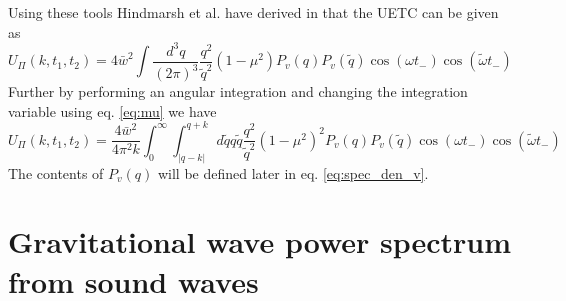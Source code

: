 \iffalse
The Fourier transformation of the velocity field can be denoted as
\cite[eq. 3.13]{hindmarsh_gw_pt_2019}
\begin{equation}
\tilde{v}_\mathbb{q}^i(t) = \int d^3 xv^i (\mathbb{x},t) e^{-i \mathbb{q} \cdot \mathbb{x}}.
\end{equation}
We use the same result as in \cite{hindmarsh_gw_pt_2019} that the velocity field is irrotational and statistically homogenous,
and the two-point function $G$ can therefore be written as
\begin{equation}
\langle \tilde{v}_{\mathbb{q}_1}^i (t_1) \tilde{v}_{\mathbb{q}_2}^{*j} (t2) \rangle = \hat{q}_1^i \hat{q}_2^j G(q_1, t_1, t_2) (2\pi)^3 \delta(\mathbb{q_1} - \mathbb{q_2}).
\end{equation}
The leading term for the shear stress UETC of eq. \eqref{eq:uetc_final} is therefore
\fi

Using these tools Hindmarsh et al. have derived in \cite{hindmarsh_gw_pt_2019} that the UETC can be given as
\cite[eq. 3.32]{hindmarsh_gw_pt_2019}
\begin{equation}
U_\Pi(k, t_1, t_2) = 4 \bar{w}^2 \int \frac{d^3 q}{(2\pi)^3} \frac{q^2}{\tilde{q}^2} (1 - \mu^2) P_v(q) P_v(\tilde{q}) \cos (\omega t_-) \cos (\tilde{\omega} t_-)
\end{equation}
Further by performing an angular integration and changing the integration variable using eq. \eqref{eq:mu} we have
\cite[eq. 3.34]{hindmarsh_gw_pt_2019}
\begin{equation}
U_\Pi (k, t_1, t_2) = \frac{4 \bar{w}^2}{4 \pi^2 k} \int_0^\infty \int_{|q-k|}^{q+k} d\tilde{q} q \tilde{q}
\frac{q^2}{\tilde{q}^2} (1-\mu^2)^2
P_v(q) P_v(\tilde{q})
\cos (\omega t_-) \cos (\tilde{\omega} t_-)
\label{eq:uetc_final}
\end{equation}
The contents of $P_v(q)$ will be defined later in eq. \eqref{eq:spec_den_v}.


\section{Gravitational wave power spectrum from sound waves}
